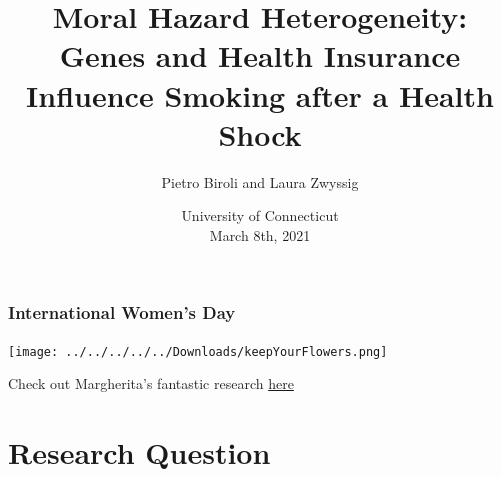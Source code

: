 \documentclass[10pt,compress,xcolor=dvipsnames,aspectratio=169]{beamer}    %
\title[GxInsurance]{
\textbf{Moral Hazard Heterogeneity: \\ Genes and Health Insurance Influence Smoking after a Health Shock}
}
\author[Pietro, Laura]{
Pietro Biroli and Laura Zwyssig
\\ \medskip {\scriptsize thanks to GEIGHEI team, Regina Seibel, and Pia Arce}
}%
\institute[UZH]{University of Z\"urich}
\date{{\color{blue} University of Connecticut} \\ {\color{Verde} March 8th, 2021}}
\newcounter{ex}
\newcommand{\1}[1]{\mathrm{1\hspace*{-2.5pt}l}[#1]}	%
\begin{document}
\frame{\titlepage}




\begin{frame}
\frametitle{International Women's Day}
\begin{center}
\texttt{[image: ../../../../../Downloads/keepYourFlowers.png]} 

\end{center}
Check out Margherita's fantastic research \href{https://www.qmul.ac.uk/sbcs/staff/margheritamalanchini.html}{here}
\end{frame}

\section{Research Question}

%
\end{document}
